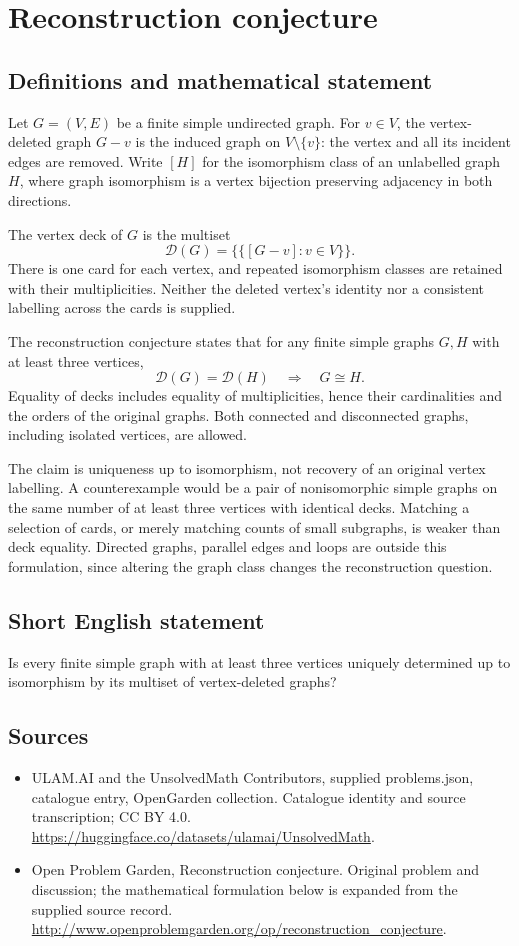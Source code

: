 \documentclass[11pt,a4paper]{article}
\begin{document}
\section*{Reconstruction conjecture}\label{statement}

\subsection{Definitions and mathematical statement}
Let $G=(V,E)$ be a finite simple undirected graph. For $v\in V$, the
vertex-deleted graph $G-v$ is the induced graph on $V\setminus\{v\}$:
the vertex and all its incident edges are removed. Write $[H]$ for the
isomorphism class of an unlabelled graph $H$, where graph isomorphism is
a vertex bijection preserving adjacency in both directions.

The vertex deck of $G$ is the multiset
\[
 \mathcal D(G)=\{\!\{[G-v]:v\in V\}\!\}.
\]
There is one card for each vertex, and repeated isomorphism classes are
retained with their multiplicities. Neither the deleted vertex's identity
nor a consistent labelling across the cards is supplied.

The reconstruction conjecture states that for any finite simple graphs
$G,H$ with at least three vertices,
\[
 \mathcal D(G)=\mathcal D(H)\quad\Longrightarrow\quad G\cong H.
\]
Equality of decks includes equality of multiplicities, hence their
cardinalities and the orders of the original graphs. Both connected and
disconnected graphs, including isolated vertices, are allowed.

The claim is uniqueness up to isomorphism, not recovery of an original
vertex labelling. A counterexample would be a pair of nonisomorphic
simple graphs on the same number of at least three vertices with identical
decks. Matching a selection of cards, or merely matching counts of small
subgraphs, is weaker than deck equality. Directed graphs, parallel edges
and loops are outside this formulation, since altering the graph class
changes the reconstruction question.
\subsection{Short English statement}
Is every finite simple graph with at least three vertices uniquely determined up to isomorphism by its multiset of vertex-deleted graphs?
\subsection{Sources}
\begin{itemize}
\item[S1] ULAM.AI and the UnsolvedMath Contributors, supplied problems.json, catalogue entry, OpenGarden collection. Catalogue identity and source transcription; CC BY 4.0.
\url{https://huggingface.co/datasets/ulamai/UnsolvedMath}.
\item[S2] Open Problem Garden, Reconstruction conjecture. Original problem and discussion; the mathematical formulation below is expanded from the supplied source record.
\url{http://www.openproblemgarden.org/op/reconstruction_conjecture}.
\end{itemize}
\end{document}
